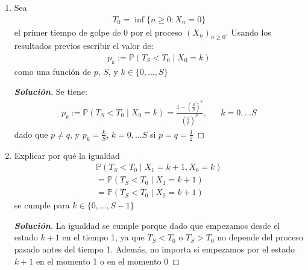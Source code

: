 \documentclass[12pt, letterpaper]{article}
\newcommand{\p}{\mathbb{P}}
\newenvironment{manualtheorem}[1]{%
  \renewcommand\themanualtheoreminner{#1}%
  \manualtheoreminner
}{\endmanualtheoreminner}
\newenvironment{solucion}
  {\renewcommand\qedsymbol{$\square$}\begin{proof}[\textbf{Solución}]}
  {\end{proof}}
\begin{document}
\begin{manualtheorem}{3.2}
\begin{enumerate}
\begin{solucion}
\begin{align*}
            \end{align*}
            donde 
            \begin{align*}
                0=g(S)=-S^2+C_1+C_2S\textrm{, y }\\
                \frac{g(0)}{2}=\frac{C_1}{2}=1+\frac{g(1)}{2}=1+\frac{(-1+C_1+C_2)}{2}
            \end{align*}
            Por lo tanto $C_1=S(S+1)$ y $C_2=-1$, entonces
            \begin{align*}
                g(k)=\mathbb{E}[T_S \mid X_0 = k]=(S+k+1)(S-k),  & & k=0,\dots,S
            \end{align*}
        \end{solucion}
        
        \item Sea
        \begin{align*}
            T_0=\inf \{ n\geq 0 : X_n=0\}
        \end{align*}
        el primer tiempo de golpe de 0 por el proceso $(X_n)_{n\geq0}$. Usando los resultados previos escribir el valor de:
        \begin{align*}
            p_k:= \p(T_S< T_0\mid X_0=k)
        \end{align*}
        como una función de $p$, $S$, y $k\in \{0,\dots,S\}$
        
        \begin{solucion}
            Se tiene:
            \begin{align*}
                p_k:= \p(T_S< T_0\mid X_0=k)=\frac{1-\left(\frac{q}{p}\right)^k}{\left(\frac{q}{p}\right)^S}, & & k=0,\dots S
            \end{align*}
            dado que $p\neq q$, y $p_k= \frac{k}{S}$, $k=0,\dots S$ si $p=q=\frac{1}{2}$
        \end{solucion}
        
        \item Explicar por qué la igualdad
        \begin{align*}
            \p(T_S< T_0\mid X_1=k+1, X_0=k)\\
            =\p(T_S< T_0\mid X_1=k+1)\\
            =\p(T_S< T_0\mid X_0=k+1)
        \end{align*}
        se cumple para $k\in \{0,\dots,S-1 \}$
        \begin{solucion}
            La igualdad se cumple porque dado que empezamos desde el estado $k+1$ en el tiempo 1, ya que $T_S<T_0$ o $T_S>T_0$ no depende del proceso pasado antes del tiempo 1. Además, no importa si empezamos por el estado $k +1$ en el momento 1 o en el momento 0
        \end{solucion}
        

\end{enumerate}
\end{manualtheorem}
\end{document}
